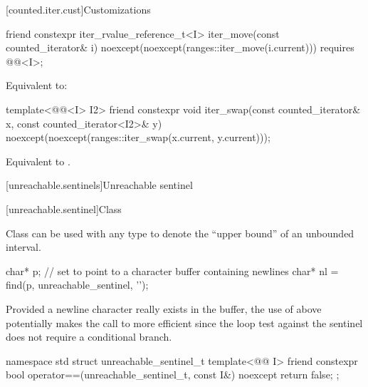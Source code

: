 [counted.iter.cust]{Customizations}

%
\begin{itemdecl}
friend constexpr iter_rvalue_reference_t<I>
  iter_move(const counted_iterator& i)
    noexcept(noexcept(ranges::iter_move(i.current)))
    requires @@<I>;
\end{itemdecl}

\begin{itemdescr}
\pnum
\effects
Equivalent to: 
\end{itemdescr}

%
\begin{itemdecl}
template<@@<I> I2>
  friend constexpr void
    iter_swap(const counted_iterator& x, const counted_iterator<I2>& y)
      noexcept(noexcept(ranges::iter_swap(x.current, y.current)));
\end{itemdecl}

\begin{itemdescr}
\pnum
\effects
Equivalent to .
\end{itemdescr}

[unreachable.sentinels]{Unreachable sentinel}

[unreachable.sentinel]{Class }

%
\pnum
Class  can be used with
any  type
to denote the ``upper bound'' of an unbounded interval.

\pnum
\begin{example}
\begin{codeblock}
char* p;
// set  to point to a character buffer containing newlines
char* nl = find(p, unreachable_sentinel, '\n');
\end{codeblock}

Provided a newline character really exists in the buffer, the use of
 above potentially makes the call to  more
efficient since the loop test against the sentinel does not require a
conditional branch.
\end{example}

%
\begin{codeblock}
namespace std {
  struct unreachable_sentinel_t {
    template<@@ I>
      friend constexpr bool operator==(unreachable_sentinel_t, const I&) noexcept
      { return false; }
  };
}
\end{codeblock}


